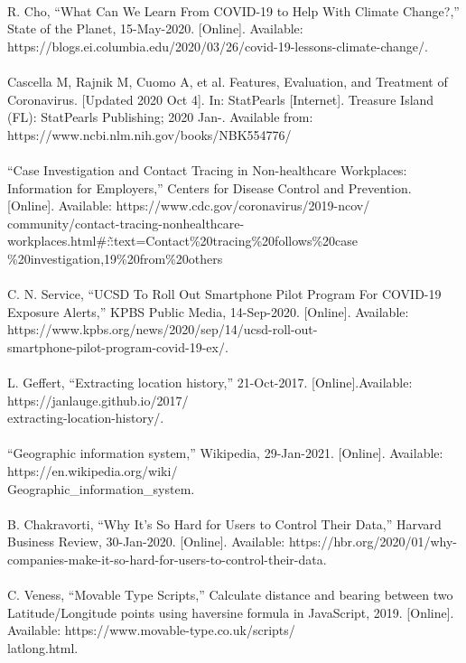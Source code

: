 \documentclass{ucsdreport}
\begin{document}
\\
R. Cho, “What Can We Learn From COVID-19 to Help With Climate Change?,” State of the Planet, 15-May-2020. [Online]. Available: https://blogs.ei.columbia.edu/2020/03/26/covid-19-lessons-climate-change/. 
\\
\\
Cascella M, Rajnik M, Cuomo A, et al. Features, Evaluation, and Treatment of Coronavirus. [Updated 2020 Oct 4]. In: StatPearls [Internet]. Treasure Island (FL): StatPearls Publishing; 2020 Jan-. Available from: https://www.ncbi.nlm.nih.gov/books/NBK554776/
\\
\\
“Case Investigation and Contact Tracing in Non-healthcare Workplaces: Information for Employers,” Centers for Disease Control and Prevention. [Online]. Available: https://www.cdc.gov/coronavirus/2019-ncov/\\
community/contact-tracing-nonhealthcare-workplaces.html\#:\~:text=Contact\%20tracing\%20follows\%20case\\
\%20investigation,19\%20from\%20others
\\
\\
C. N. Service, “UCSD To Roll Out Smartphone Pilot Program For COVID-19 Exposure Alerts,” KPBS Public Media, 14-Sep-2020. [Online]. Available: https://www.kpbs.org/news/2020/sep/14/ucsd-roll-out-\\
smartphone-pilot-program-covid-19-ex/. 
\\
\\
L. Geffert, “Extracting location history,” 21-Oct-2017. [Online].Available: https://janlauge.github.io/2017/\\
extracting-location-history/. 
\\
\\
“Geographic information system,” Wikipedia, 29-Jan-2021. [Online]. Available: https://en.wikipedia.org/wiki/\\Geographic\_information\_system.
\\
\\
B. Chakravorti, “Why It's So Hard for Users to Control Their Data,” Harvard Business Review, 30-Jan-2020. [Online]. Available: https://hbr.org/2020/01/why-companies-make-it-so-hard-for-users-to-control-their-data.
\\
\\
C. Veness, “Movable Type Scripts,” Calculate distance and bearing between
two Latitude/Longitude points using haversine formula in JavaScript, 2019.
[Online]. Available: https://www.movable-type.co.uk/scripts/\\
latlong.html. 
\end{document}
